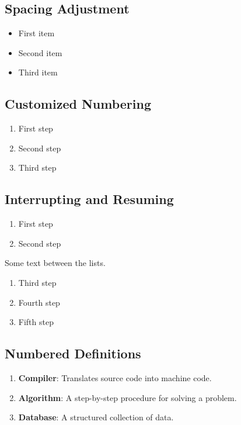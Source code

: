 \documentclass{article}
\begin{document}
\subsection*{Spacing Adjustment}

\begin{itemize}[itemsep=10pt]
    \item First item
    \item Second item
    \item Third item
\end{itemize}


\subsection*{Customized Numbering}

\begin{enumerate}[label=\Roman*.]
    \item First step
    \item Second step
    \item Third step
\end{enumerate}


\subsection*{Interrupting and Resuming}

\begin{enumerate}
    \item First step
    \item Second step
\end{enumerate}

Some text between the lists.

\begin{enumerate}[resume]
    \item Third step
    \item Fourth step
    \item Fifth step
\end{enumerate}


\subsection*{Numbered Definitions}

\begin{enumerate}
    \item \textbf{Compiler}: Translates source code into machine code.
    \item \textbf{Algorithm}: A step-by-step procedure for solving a problem.
    \item \textbf{Database}: A structured collection of data.
\end{enumerate}
\end{document}

